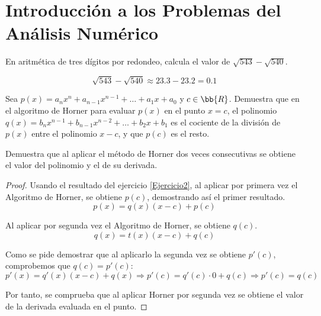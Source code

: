 \section{Introducción a los Problemas del Análisis Numérico} \label{sec:Rel1}


\begin{ejercicio}
    En aritmética de tres dígitos por redondeo, calcula el valor de $\sqrt{543}-\sqrt{540}$.

    \begin{equation*}
        \sqrt{543}-\sqrt{540} \approx 23.3-23.2 = 0.1
    \end{equation*}
\end{ejercicio}

\begin{ejercicio}\label{Ejercicio2}
    Sea $p(x) = a_n x^n + a_{n-1}x^{n-1} + \dots + a_1x+a_0$ y $c\in\bb{R}$. Demuestra que en el algoritmo de Horner para evaluar $p(x)$ en el punto $x = c$, el polinomio $q(x) = b_n x^{n-1} + b_{n-1} x^{n-2} + \dots + b_2x + b_1$ es el cociente de la división de $p(x)$ entre el polinomio $x-c$, y que $p(c)$ es el resto.
\end{ejercicio}

\begin{ejercicio}
    Demuestra que al aplicar el método de Horner dos veces consecutivas se obtiene el valor del polinomio y el de su derivada.
    \begin{proof}
        Usando el resultado del ejercicio \ref{Ejercicio2}, al aplicar por primera vez el Algoritmo de Horner, se obtiene $p(c)$, demostrando así el primer resultado.
        $$p(x) = q(x)(x-c)+p(c)$$
    
        Al aplicar por segunda vez el Algoritmo de Horner, se obtiene $q(c)$.
        $$q(x) = t(x)(x-c)+q(c)$$
    
        Como se pide demostrar que al aplicarlo la segunda vez se obtiene $p'(c)$, comprobemos que $q(c)=p'(c)$:
        $$p'(x) = q'(x)(x-c) + q(x) \Longrightarrow p'(c) = q'(c)\cdot 0 + q(c) \Longrightarrow p'(c) = q(c)$$
    
        Por tanto, se comprueba que al aplicar Horner por segunda vez se obtiene el valor de la derivada evaluada en el punto.
    \end{proof}
\end{ejercicio}

